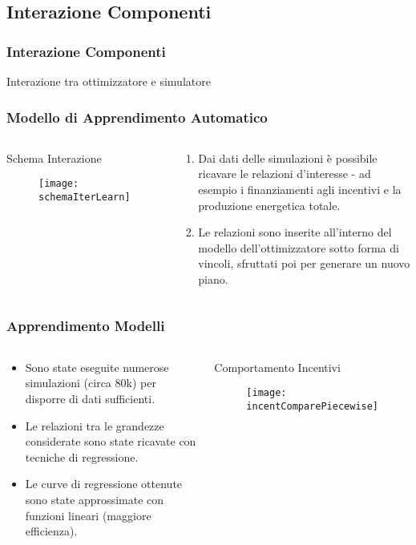 \documentclass{beamer}
\begin{document}
\subsection{Interazione Componenti}
	\begin{frame}
		\frametitle{Interazione Componenti}
		Interazione tra ottimizzatore e simulatore
  	\end{frame}
  	\begin{frame}
		\frametitle{Modello di Apprendimento Automatico}
		\begin{columns}
		\begin{block}{Schema Interazione}
			\begin{figure}[htb]
				\centering
				\texttt{[image: schemaIterLearn]}
			  	\label{schemaIterLearn}
			\end{figure}
		\end{block}
		\begin{block}{}
			\begin{enumerate}
				\item Dai dati delle simulazioni è possibile ricavare le relazioni d'interesse - ad esempio i finanziamenti agli incentivi e la produzione energetica totale.
				\item Le relazioni sono inserite all'interno del modello dell'ottimizzatore sotto forma di vincoli, sfruttati poi per generare un nuovo piano.
			\end{enumerate}
		\end{block}
		\end{columns}
		
	\end{frame}
	\begin{frame}
		\frametitle{Apprendimento Modelli}
		\begin{columns}
		\column{.5\textwidth}
		\begin{block}{}
			\begin{itemize}
				\item Sono state eseguite numerose simulazioni (circa 80k) per disporre di dati sufficienti.
				\item Le relazioni tra le grandezze considerate sono state ricavate con tecniche di regressione.
				\item Le curve di regressione ottenute sono state approssimate con funzioni lineari (maggiore efficienza).
			\end{itemize}
		\end{block}
		\column{.5\textwidth}
		\begin{block}{Comportamento Incentivi}
			\begin{figure}[hbt]
				\centering
				\texttt{[image: incentComparePiecewise]}
				\label{incentComparePiecewise}
			\end{figure}
		\end{block}
		\end{columns}
  	\end{frame}
\end{document}
